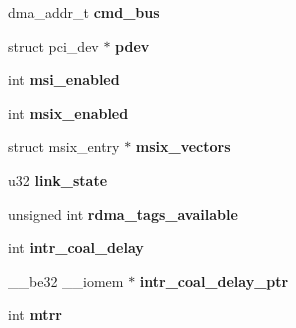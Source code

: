 \begin{DoxyCompactItemize}
\item 
\hypertarget{structmyri10ge__priv_a02ed20322fa8c14d0f5ce835cc780c0a}{
dma\_\-addr\_\-t {\bfseries cmd\_\-bus}}
\label{structmyri10ge__priv_a02ed20322fa8c14d0f5ce835cc780c0a}

\item 
\hypertarget{structmyri10ge__priv_abd4b57ebc24c31a61876378def87fb9a}{
struct pci\_\-dev $\ast$ {\bfseries pdev}}
\label{structmyri10ge__priv_abd4b57ebc24c31a61876378def87fb9a}

\item 
\hypertarget{structmyri10ge__priv_a4427ea84d250d567b0a78c23cc558f70}{
int {\bfseries msi\_\-enabled}}
\label{structmyri10ge__priv_a4427ea84d250d567b0a78c23cc558f70}

\item 
\hypertarget{structmyri10ge__priv_a83237006cafab04e2cf6f71c7987d1a7}{
int {\bfseries msix\_\-enabled}}
\label{structmyri10ge__priv_a83237006cafab04e2cf6f71c7987d1a7}

\item 
\hypertarget{structmyri10ge__priv_ac3570bd904153a897bd5c721cc66c2d3}{
struct msix\_\-entry $\ast$ {\bfseries msix\_\-vectors}}
\label{structmyri10ge__priv_ac3570bd904153a897bd5c721cc66c2d3}

\item 
\hypertarget{structmyri10ge__priv_a2df259948cffb19697f57580509dffea}{
u32 {\bfseries link\_\-state}}
\label{structmyri10ge__priv_a2df259948cffb19697f57580509dffea}

\item 
\hypertarget{structmyri10ge__priv_a7c334e1e3eb62377f59617f58590d80a}{
unsigned int {\bfseries rdma\_\-tags\_\-available}}
\label{structmyri10ge__priv_a7c334e1e3eb62377f59617f58590d80a}

\item 
\hypertarget{structmyri10ge__priv_a5b4da3f9c08892534d933c7f04b68cd7}{
int {\bfseries intr\_\-coal\_\-delay}}
\label{structmyri10ge__priv_a5b4da3f9c08892534d933c7f04b68cd7}

\item 
\hypertarget{structmyri10ge__priv_a0d97d623fac39a38debe8c5e2701f405}{
\_\-\_\-be32 \_\-\_\-iomem $\ast$ {\bfseries intr\_\-coal\_\-delay\_\-ptr}}
\label{structmyri10ge__priv_a0d97d623fac39a38debe8c5e2701f405}

\item 
\hypertarget{structmyri10ge__priv_a96112a58992b68191c8925cb4c9dcb04}{
int {\bfseries mtrr}}
\label{structmyri10ge__priv_a96112a58992b68191c8925cb4c9dcb04}


\end{DoxyCompactItemize}
